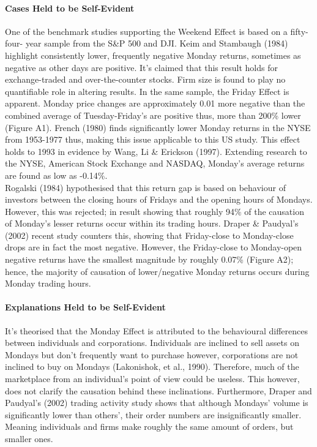 \documentclass[11pt, english]{article}
\begin{document}
			\paragraph{Cases Held to be Self-Evident}

			One of the benchmark studies supporting the Weekend Effect is based on a fifty-four- year sample from the S\&P 500 and DJI. Keim and Stambaugh (1984) highlight consistently lower, frequently negative Monday returns, sometimes as negative as other days are positive. It’s claimed that this result holds for exchange-traded and over-the-counter stocks. Firm size is found to play no quantifiable role in altering results. In the same sample, the Friday Effect is apparent. Monday price changes are approximately 0.01 more negative than the combined average of Tuesday-Friday’s are positive thus, more than 200\% lower (Figure A1). French (1980) finds significantly lower Monday returns in the NYSE from 1953-1977 thus, making this issue applicable to this US study. This effect holds to 1993 in evidence by Wang, Li \& Erickson (1997). Extending research to the NYSE, American Stock Exchange and NASDAQ, Monday’s average returns are found as low as -0.14\%.\\

			Rogalski (1984) hypothesised that this return gap is based on behaviour of investors between the closing hours of Fridays and the opening hours of Mondays. However, this was rejected; in result showing that roughly 94\% of the causation of Monday’s lesser returns occur within its trading hours. Draper \& Paudyal’s (2002) recent study counters this, showing that Friday-close to Monday-close drops are in fact the most negative. However, the Friday-close to Monday-open negative returns have the smallest magnitude by roughly 0.07\% (Figure A2); hence, the majority of causation of lower/negative Monday returns occurs during Monday trading hours.

			\paragraph{Explanations Held to be Self-Evident}

			It’s theorised that the Monday Effect is attributed to the behavioural differences between individuals and corporations. Individuals are inclined to sell assets on Mondays but don’t frequently want to purchase however, corporations are not inclined to buy on Mondays (Lakonishok, et al., 1990). Therefore, much of the marketplace from an individual’s point of view could be useless. This however, does not clarify the causation behind these inclinations. Furthermore, Draper and Paudyal’s (2002) trading activity study shows that although Mondays' volume is significantly lower than others', their order numbers are insignificantly smaller. Meaning individuals and firms make roughly the same amount of orders, but smaller ones.\\
\end{document}
